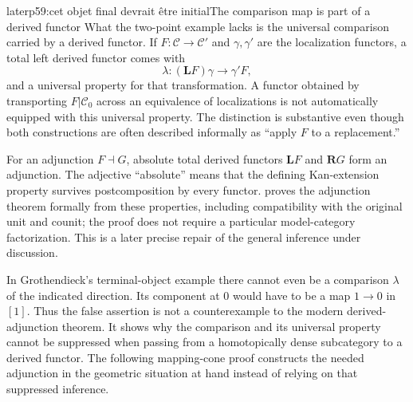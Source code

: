 \begin{dcomment}{later}{p59:cet objet final devrait être initial}{The comparison map is part of a derived functor}
What the two-point example lacks is the universal comparison carried by a derived functor. If $F:\mathcal C\to\mathcal C'$ and $\gamma,\gamma'$ are the localization functors, a total left derived functor comes with
\[
 \lambda:(\mathbf L F)\gamma\longrightarrow\gamma'F,
\]
and a universal property for that transformation. A functor obtained by transporting $F|\mathcal C_0$ across an equivalence of localizations is not automatically equipped with this universal property. The distinction is substantive even though both constructions are often described informally as ``apply $F$ to a replacement.''

For an adjunction $F\dashv G$, absolute total derived functors $\mathbf L F$ and $\mathbf R G$ form an adjunction. The adjective ``absolute'' means that the defining Kan-extension property survives postcomposition by every functor. \citet{Maltsiniotis2007Adjunction} proves the adjunction theorem formally from these properties, including compatibility with the original unit and counit; the proof does not require a particular model-category factorization. This is a later precise repair of the general inference under discussion.

In Grothendieck's terminal-object example there cannot even be a comparison $\lambda$ of the indicated direction. Its component at $0$ would have to be a map $1\to0$ in $[1]$. Thus the false assertion is not a counterexample to the modern derived-adjunction theorem. It shows why the comparison and its universal property cannot be suppressed when passing from a homotopically dense subcategory to a derived functor. The following mapping-cone proof constructs the needed adjunction in the geometric situation at hand instead of relying on that suppressed inference.
\end{dcomment}

